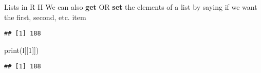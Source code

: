 \documentclass[
  10pt,
  ignorenonframetext,
  aspectratio=169]{beamer}
\newenvironment{Shaded}{\begin{snugshade}}{\end{snugshade}}
\newcommand{\DecValTok}[1]{\textcolor[rgb]{0.86,0.86,0.80}{#1}}
\newcommand{\FunctionTok}[1]{\textcolor[rgb]{0.94,0.94,0.56}{#1}}
\newcommand{\NormalTok}[1]{\textcolor[rgb]{0.80,0.80,0.80}{#1}}
\newcommand{\SpecialCharTok}[1]{\textcolor[rgb]{0.86,0.64,0.64}{#1}}
\begin{document}
\begin{frame}[fragile]{Lists in R II}
\protect\hypertarget{lists-in-r-ii}{}
We can also \textbf{get} OR \textbf{set} the elements of a list by
saying if we want the first, second, etc. item

\scriptsize

\begin{Shaded}
\end{Shaded}

\begin{verbatim}
## [1] 188
\end{verbatim}

\begin{Shaded}
\begin{Highlighting}[]
\FunctionTok{print}\NormalTok{(l[[}\DecValTok{1}\NormalTok{]])}
\end{Highlighting}
\end{Shaded}

\begin{verbatim}
## [1] 188
\end{verbatim}
\end{frame}
\end{document}
